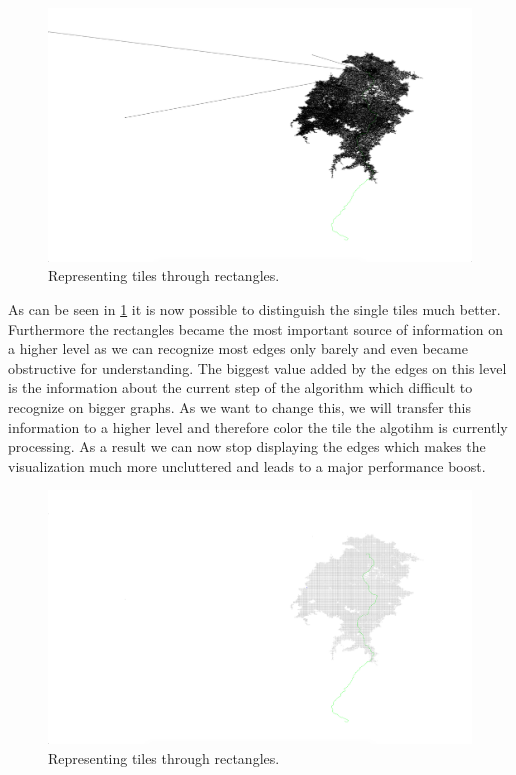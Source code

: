 \documentclass
[
	paper = a4,
    pagesize,
	12 pt,
	oneside,                       %
    open = right,
	DIV = calc,
	BCOR = 0 mm,                   %
	bibtotoc
]
{scrbook}
\begin{document}
\begin{figure}[H]
	\includegraphics[width=\textwidth]{Images/vis-rectangular-tiles.png}
\caption[]{Representing tiles through rectangles.}
\label{fig:rectangle_tiles}
\end{figure}


As can be seen in \cref{fig:rectangle_tiles} it is now possible to distinguish the single tiles much better.
Furthermore the rectangles became the most important source of information on a higher level as we can recognize most edges only barely and even became obstructive for understanding.
The biggest value added by the edges on this level is the information about the current step of the algorithm which difficult to recognize on bigger graphs.
As we want to change this, we will transfer this information to a higher level and therefore color the tile the algotihm is currently processing.
As a result we can now stop displaying the edges which makes the visualization much more uncluttered and leads to a major performance boost.

\begin{figure}[H]
	\includegraphics[width=\textwidth]{Images/vis-current-tile.png}
\caption[]{Representing tiles through rectangles.}
\label{fig:color_current_tile}
\end{figure}
\end{document}
